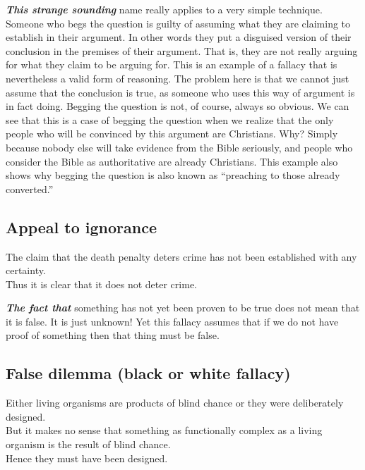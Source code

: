\documentclass[
  12pt, openany]{book}
\theoremstyle{definition}
\theoremstyle{definition}
\theoremstyle{definition}
\theoremstyle{definition}
\theoremstyle{remark}
\begin{document}
\textbf{\emph{This strange sounding}} name really applies to a very simple technique. Someone who begs the question is guilty of assuming what they are claiming to establish in their argument. In other words they put a disguised version of their conclusion in the premises of their argument. That is, they are not really arguing for what they claim to be arguing for. This is an example of a fallacy that is nevertheless a valid form of reasoning. The problem here is that we cannot just assume that the conclusion is true, as someone who uses this way of argument is in fact doing. Begging the question is not, of course, always so obvious. We can see that this is a case of begging the question when we realize that the only people who will be convinced by this argument are Christians. Why? Simply because nobody else will take evidence from the Bible seriously, and people who consider the Bible as authoritative are already Christians. This example also shows why begging the question is also known as ``preaching to those already converted.''

\hypertarget{appeal-to-ignorance}{%
\subsection*{Appeal to ignorance}\label{appeal-to-ignorance}}


\begin{center}

\begin{argument}
The claim that the death penalty deters crime has not been established with any certainty.\\
Thus it is clear that it does not deter crime.

\end{argument}


\end{center}

\textbf{\emph{The fact that}} something has not yet been proven to be true does not mean that it is false. It is just unknown! Yet this fallacy assumes that if we do not have proof of something then that thing must be false.

\hypertarget{false-dilemma-black-or-white-fallacy}{%
\subsection*{False dilemma (black or white fallacy)}\label{false-dilemma-black-or-white-fallacy}}


\begin{center}

\begin{argument}
Either living organisms are products of blind chance or they were deliberately designed.\\
But it makes no sense that something as functionally complex as a living organism is the result of blind chance.\\

Hence they must have been designed.

\end{argument}


\end{center}
\end{document}
